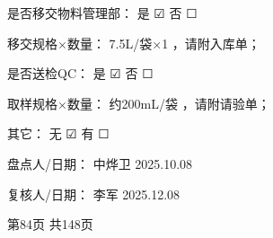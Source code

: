 \documentclass[UTF8,10pt,a4paper,fontset=fandol]{ctexart}
\newcommand{\fieldvalue}[1]{#1}
\newcommand{\handwritten}[1]{#1}
\newcommand{\checkboxfield}[1]{\ifstrequal{#1}{checked}{☑}{\ifstrequal{#1}{unclear}{?}{☐}}}
\begin{document}
\medskip

\noindent
是否移交物料管理部：
是
\fieldvalue{\checkboxfield{checked}}
\quad
否
\fieldvalue{\checkboxfield{unchecked}}

\medskip

\noindent
移交规格$\times$数量：
\fieldvalue{\handwritten{7.5L/袋$\times$1}}
，请附入库单；

\medskip

\noindent
是否送检QC：
是
\fieldvalue{\checkboxfield{checked}}
\quad
否
\fieldvalue{\checkboxfield{unchecked}}

\medskip

\noindent
取样规格$\times$数量：
\fieldvalue{\handwritten{约200mL/袋}}
，请附请验单；

\medskip

\noindent
其它：
无
\fieldvalue{\checkboxfield{checked}}
\quad
有
\fieldvalue{\checkboxfield{unchecked}}

\medskip

\noindent
盘点人/日期：
\fieldvalue{\handwritten{中烨卫}}
\quad
\fieldvalue{\handwritten{2025.10.08}}

\medskip

\noindent
复核人/日期：
\fieldvalue{\handwritten{李军}}
\quad
\fieldvalue{\handwritten{2025.12.08}}

\begin{center}
第84页 共148页
\end{center}

\newpage

\end{document}
